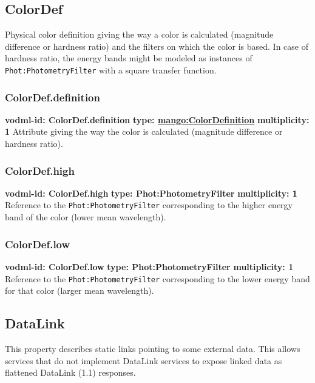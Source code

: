   \subsection{ColorDef}
  \label{sect:ColorDef}
    Physical color definition giving the way a color is calculated (magnitude difference or hardness ratio) and the filters on which the color is based. In case of hardness ratio, the energy bands might be modeled as instances of \texttt{Phot:PhotometryFilter} with a square transfer function.

    \subsubsection{ColorDef.definition}
      \textbf{vodml-id: ColorDef.definition} \newline
      \textbf{type: \hyperref[sect:ColorDefinition]{mango:ColorDefinition}} \newline
      \textbf{multiplicity: 1} \newline
      Attribute giving the way the color is calculated (magnitude difference or hardness ratio).

    \subsubsection{ColorDef.high}
      \textbf{vodml-id: ColorDef.high} \newline
      \textbf{type: Phot:PhotometryFilter} \newline
      \textbf{multiplicity: 1} \newline
      Reference to the \texttt{Phot:PhotometryFilter} \citep{2022ivoa.spec.1101S} corresponding to the higher energy band of the color (lower mean wavelength).

    \subsubsection{ColorDef.low}
      \textbf{vodml-id: ColorDef.low} \newline
      \textbf{type: Phot:PhotometryFilter} \newline
      \textbf{multiplicity: 1} \newline
      Reference to the \texttt{Phot:PhotometryFilter} corresponding to the lower energy band for that color (larger mean wavelength).

  \subsection{DataLink}
  \label{sect:DataLink}
    This property describes static links pointing to some external data. This allows services that do not implement DataLink services to expose linked data as flattened DataLink (1.1) responses.

